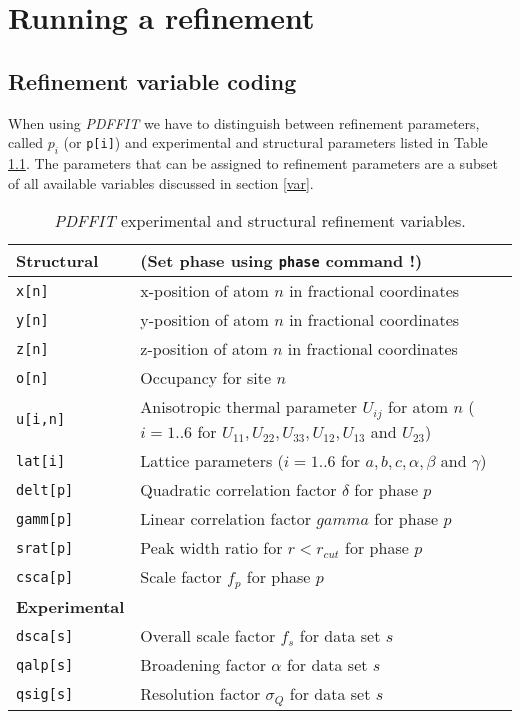 
\chapter{Running a refinement \label{fit}}
\section{Refinement variable coding \label{fit_code}}

When using {\it PDFFIT} we have to distinguish between refinement
parameters, called $p_{i}$ (or {\tt p[i]}) and experimental and structural
parameters listed in Table \ref{tab_par}. The parameters that can be
assigned to refinement parameters are a subset of all available variables
discussed in section \ref{var}.

\begin{table}[tbh]
\centering
\begin{tabularx}{\textwidth}{|p{30mm}|X|}
  \hline
  {\bf Structural}  & (Set phase using {\tt phase} command !) \\
  \hline
  {\tt x[n]}        & x-position of atom $n$ in fractional coordinates \\
  {\tt y[n]}        & y-position of atom $n$ in fractional coordinates \\
  {\tt z[n]}        & z-position of atom $n$ in fractional coordinates \\
  {\tt o[n]}        & Occupancy for site $n$ \\
  {\tt u[i,n]}      & Anisotropic thermal parameter $U_{ij}$ for atom
                      $n$ ($i=1..6$ for $U_{11},U_{22},U_{33},U_{12},
                      U_{13}$ and $U_{23}$) \\
  {\tt lat[i]}      & Lattice parameters ($i=1..6$ for $a, b, c, \alpha,
                      \beta$ and $\gamma$) \\
  {\tt delt[p]}     & Quadratic correlation factor $\delta$ for phase $p$ \\
  {\tt gamm[p]}     & Linear correlation factor $gamma$ for phase $p$ \\
  {\tt srat[p]}     & Peak width ratio for $r<r_{cut}$ for phase $p$ \\
  {\tt csca[p]}     & Scale factor $f_{p}$ for phase $p$ \\
  \hline
  {\bf Experimental}& \\
  \hline
  {\tt dsca[s]}     & Overall scale factor $f_{s}$ for data set $s$ \\
  {\tt qalp[s]}     & Broadening factor $\alpha$ for data set $s$ \\
  {\tt qsig[s]}     & Resolution factor $\sigma_{Q}$ for data set $s$ \\
  \hline
\end{tabularx}
\caption{\label{tab_par}{\it PDFFIT} experimental and structural
         refinement variables.}
\end{table}

